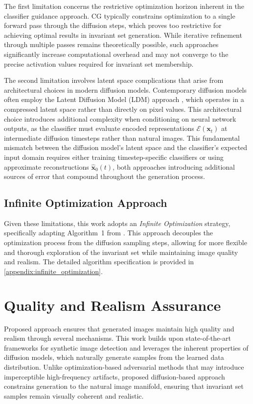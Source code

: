 The first limitation concerns the restrictive optimization horizon inherent in the classifier guidance approach. CG typically constrains optimization to a single forward pass through the diffusion steps, which proves too restrictive for achieving optimal results in invariant set generation. While iterative refinement through multiple passes remains theoretically possible, such approaches significantly increase computational overhead and may not converge to the precise activation values required for invariant set membership.

The second limitation involves latent space complications that arise from architectural choices in modern diffusion models. Contemporary diffusion models often employ the Latent Diffusion Model (LDM) approach \citep{rombach2022highresolutionimagesynthesislatent}, which operates in a compressed latent space rather than directly on pixel values. This architectural choice introduces additional complexity when conditioning on neural network outputs, as the classifier must evaluate encoded representations $\mathcal{E}(\mathbf{x}_t)$ at intermediate diffusion timesteps rather than natural images. This fundamental mismatch between the diffusion model's latent space and the classifier's expected input domain requires either training timestep-specific classifiers or using approximate reconstructions $\hat{\mathbf{x}}_0(t)$, both approaches introducing additional sources of error that compound throughout the generation process.

\subsection{Infinite Optimization Approach}

Given these limitations, this work adopts an \textit{Infinite Optimization} strategy, specifically adapting Algorithm~1 from \citep{augustin2024digindiffusionguidanceinvestigating}. This approach decouples the optimization process from the diffusion sampling steps, allowing for more flexible and thorough exploration of the invariant set while maintaining image quality and realism. The detailed algorithm specification is provided in \cref{appendix:infinite_optimization}.

\section{Quality and Realism Assurance}\label{method:quality_realism}

Proposed approach ensures that generated images maintain high quality and realism through several mechanisms. This work builds upon state-of-the-art frameworks for synthetic image detection and leverages the inherent properties of diffusion models, which naturally generate samples from the learned data distribution. Unlike optimization-based adversarial methods that may introduce imperceptible high-frequency artifacts, proposed diffusion-based approach constrains generation to the natural image manifold, ensuring that invariant set samples remain visually coherent and realistic.

